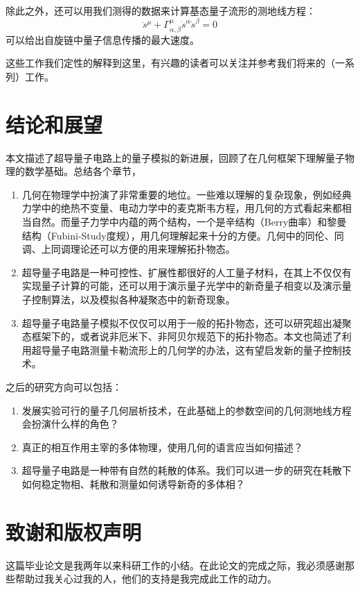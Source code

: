 \documentclass[supercite]{HustGraduPaper}
\begin{document}
除此之外，还可以用我们测得的数据来计算基态量子流形的测地线方程：
\begin{equation}
\ddot{s}^\mu + \Gamma_{\alpha,\beta}^\mu \dot{s}^\alpha \dot{s}^\beta = 0
\end{equation}
可以给出自旋链中量子信息传播的最大速度。
   
   这些工作我们定性的解释到这里，有兴趣的读者可以关注并参考我们将来的（一系列）工作\cite{Qihaotomography}。
   
	\section{结论和展望}
   本文描述了超导量子电路上的量子模拟的新进展，回顾了在几何框架下理解量子物理的数学基础。总结各个章节，
   \begin{enumerate}
   	\item 几何在物理学中扮演了非常重要的地位。一些难以理解的复杂现象，例如经典力学中的绝热不变量、电动力学中的麦克斯韦方程，用几何的方式看起来都相当自然。而量子力学中内蕴的两个结构，一个是辛结构（Berry曲率）和黎曼结构（Fubini-Study度规），用几何理解起来十分的方便。几何中的同伦、同调、上同调理论还可以方便的用来理解拓扑物态。
   	\item 超导量子电路是一种可控性、扩展性都很好的人工量子材料，在其上不仅仅有实现量子计算的可能，还可以用于演示量子光学中的新奇量子相变以及演示量子控制算法，以及模拟各种凝聚态中的新奇现象。
   	\item 超导量子电路量子模拟不仅仅可以用于一般的拓扑物态，还可以研究超出凝聚态框架下的，或者说非厄米下、非阿贝尔规范下的拓扑物态。本文也简述了利用超导量子电路测量卡勒流形上的几何学的办法，这有望启发新的量子控制技术。
   \end{enumerate}
   之后的研究方向可以包括：
   \begin{enumerate}
   	\item 发展实验可行的量子几何层析技术，在此基础上的参数空间的几何测地线方程会扮演什么样的角色？
   	\item 真正的相互作用主宰的多体物理，使用几何的语言应当如何描述？
   	\item 超导量子电路是一种带有自然的耗散的体系。我们可以进一步的研究在耗散下如何稳定物相、耗散和测量如何诱导新奇的多体相？
   \end{enumerate}


	\section{致谢和版权声明}
	这篇毕业论文是我两年以来科研工作的小结。在此论文的完成之际，我必须感谢那些帮助过我关心过我的人，他们的支持是我完成此工作的动力。
	
\end{document}
